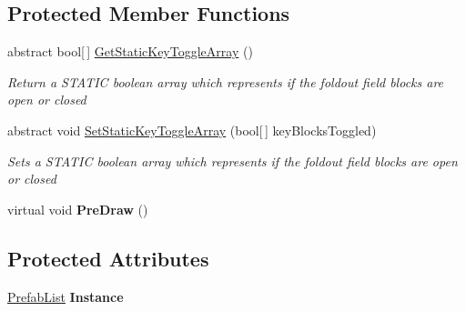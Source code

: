 \subsection*{Protected Member Functions}
\begin{DoxyCompactItemize}
\item 
abstract bool\mbox{[}$\,$\mbox{]} \hyperlink{class_prefab_list_editor_3_01_t_key_00_01_t_value_01_4_a94743b1cef0384af10fec9b4121d78b8}{Get\-Static\-Key\-Toggle\-Array} ()
\begin{DoxyCompactList}\small\item\em Return a S\-T\-A\-T\-I\-C boolean array which represents if the foldout field blocks are open or closed \end{DoxyCompactList}\item 
abstract void \hyperlink{class_prefab_list_editor_3_01_t_key_00_01_t_value_01_4_a7854686cfcba09b2c55ace182e38eddf}{Set\-Static\-Key\-Toggle\-Array} (bool\mbox{[}$\,$\mbox{]} key\-Blocks\-Toggled)
\begin{DoxyCompactList}\small\item\em Sets a S\-T\-A\-T\-I\-C boolean array which represents if the foldout field blocks are open or closed \end{DoxyCompactList}\item 
\hypertarget{class_prefab_list_editor_3_01_t_key_00_01_t_value_01_4_a8b66398e5fb2b747c14c860a98095b94}{virtual void {\bfseries Pre\-Draw} ()}\label{class_prefab_list_editor_3_01_t_key_00_01_t_value_01_4_a8b66398e5fb2b747c14c860a98095b94}

\end{DoxyCompactItemize}
\subsection*{Protected Attributes}
\begin{DoxyCompactItemize}
\item 
\hypertarget{class_prefab_list_editor_3_01_t_key_00_01_t_value_01_4_a7accbbaafa51db21d173281bf7f21918}{\hyperlink{class_skyrates_1_1_client_1_1_util_1_1_prefab_list}{Prefab\-List} {\bfseries Instance}}\label{class_prefab_list_editor_3_01_t_key_00_01_t_value_01_4_a7accbbaafa51db21d173281bf7f21918}

\end{DoxyCompactItemize}



